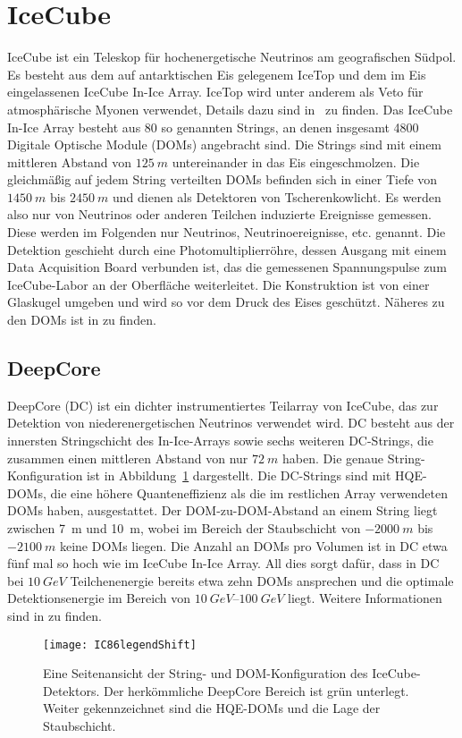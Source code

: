 \section{IceCube}
IceCube \cite{icecube-detector-reference} ist ein Teleskop für hochenergetische Neutrinos am geografischen Südpol.
Es besteht aus dem auf antarktischen Eis gelegenem IceTop und dem im Eis eingelassenen IceCube In-Ice Array.
IceTop wird unter anderem als Veto für atmosphärische Myonen verwendet, Details dazu sind in~\cite{icetop-reference} zu finden.
Das IceCube In-Ice Array besteht aus 80 so genannten Strings, an denen insgesamt 4800 Digitale Optische Module (DOMs) angebracht sind.
Die Strings sind mit einem mittleren Abstand von $\SI{125}{m}$ untereinander in das Eis eingeschmolzen.
Die gleichmäßig auf jedem String verteilten DOMs befinden sich in einer Tiefe von $\SI{1450}{m}$ bis $\SI{2450}{m}$ und dienen als Detektoren von Tscherenkowlicht.
Es werden also nur von Neutrinos oder anderen Teilchen induzierte Ereignisse gemessen. 
Diese werden im Folgenden nur Neutrinos, Neutrinoereignisse, etc. genannt.
Die Detektion geschieht durch eine Photomultiplierröhre, dessen Ausgang mit einem Data Acquisition Board verbunden ist, das die gemessenen Spannungspulse zum IceCube-Labor an der Oberfläche weiterleitet.
Die Konstruktion ist von einer Glaskugel umgeben und wird so vor dem Druck des Eises geschützt.
Näheres zu den DOMs ist in \cite{dom-paper} zu finden.

\subsection*{DeepCore}
DeepCore (DC) ist ein dichter instrumentiertes Teilarray von IceCube, das zur Detektion von niederenergetischen Neutrinos verwendet wird.
DC besteht aus der innersten Stringschicht des In-Ice-Arrays sowie sechs weiteren DC-Strings, die zusammen einen mittleren Abstand von nur $\SI{72}{m}$ haben. 
Die genaue String-Konfiguration ist in Abbildung~\ref{fig:icecube} dargestellt.
Die DC-Strings sind mit HQE-DOMs, die eine höhere Quanteneffizienz als die im restlichen Array verwendeten DOMs haben, ausgestattet. 
Der DOM-zu-DOM-Abstand an einem String liegt zwischen \SI{7}{m} und \SI{10}{m}, wobei im Bereich der Staubschicht von $\SI{-2000}{m}$ bis $\SI{-2100}{m}$ keine DOMs liegen.
Die Anzahl an DOMs pro Volumen ist in DC etwa fünf mal so hoch wie im IceCube In-Ice Array.
All dies sorgt dafür, dass in DC bei $\SI{10}{GeV}$ Teilchenenergie bereits etwa zehn DOMs ansprechen und die optimale Detektionsenergie im Bereich von $\SIrange{10}{100}{GeV}$ liegt.
Weitere Informationen sind in \cite{deepcore-reference} zu finden.
\begin{figure}
\begin{center}
    \texttt{[image: IC86legendShift]}
\end{center}
\vspace{-2em}
\caption{Eine Seitenansicht der String- und DOM-Konfiguration des IceCube-Detektors. Der herkömmliche DeepCore Bereich ist grün unterlegt. Weiter gekennzeichnet sind die HQE-DOMs und die Lage der Staubschicht.}
\label{fig:icecube}
\end{figure}



